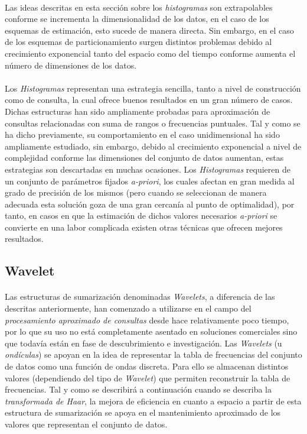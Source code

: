 \documentclass{subfiles}
\begin{document}
        \paragraph{}
        Las ideas descritas en esta sección sobre los \emph{histogramas} son extrapolables conforme se incrementa la dimensionalidad de los datos, en el caso de los esquemas de estimación, esto sucede de manera directa. Sin embargo, en el caso de los esquemas de particionamiento surgen distintos problemas debido al crecimiento exponencial tanto del espacio como del tiempo conforme aumenta el número de dimensiones de los datos.

        \paragraph{}
        Los \emph{Histogramas} representan una estrategia sencilla, tanto a nivel de construcción como de consulta, la cual ofrece buenos resultados en un gran número de casos. Dichas estructuras han sido ampliamente probadas para aproximación de consultas relacionadas con suma de rangos o frecuencias puntuales. Tal y como se ha dicho previamente, su comportamiento en el caso unidimensional ha sido ampliamente estudiado, sin embargo, debido al crecimiento exponencial a nivel de complejidad conforme las dimensiones del conjunto de datos aumentan, estas estrategias son descartadas en muchas ocasiones. Los \emph{Histogramas} requieren de un conjunto de parámetros fijados \emph{a-priori}, los cuales afectan en gran medida al grado de precisión de los mismos (pero cuando se seleccionan de manera adecuada esta solución goza de una gran cercanía al punto de optimalidad), por tanto, en casos en que la estimación de dichos valores necesarios \emph{a-priori} se convierte en una labor complicada existen otras técnicas que ofrecen mejores resultados.

      \subsection{Wavelet}
      \label{sec:wavelet}

        \paragraph{}
        Las estructuras de sumarización denominadas \emph{Wavelets}, a diferencia de las descritas anteriormente, han comenzado a utilizarse en el campo del \emph{procesamiento aproximado de consultas} desde hace relativamente poco tiempo, por lo que su uso no está completamente asentado en soluciones comerciales sino que todavía están en fase de descubrimiento e investigación. Las \emph{Wavelets} (u \emph{ondículas}) se apoyan en la idea de representar la tabla de frecuencias del conjunto de datos como una función de ondas discreta. Para ello se almacenan distintos valores (dependiendo del tipo de \emph{Wavelet}) que permiten reconstruir la tabla de frecuencias. Tal y como se describirá a continuación cuando se describa la \emph{transformada de Haar}, la mejora de eficiencia en cuanto a espacio a partir de esta estructura de sumarización se apoya en el mantenimiento aproximado de los valores que representan el conjunto de datos.
\end{document}
